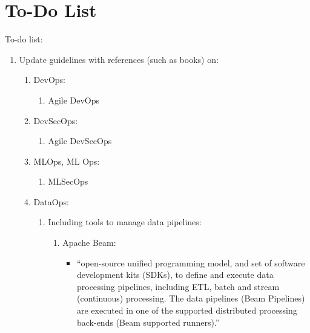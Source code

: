 \documentclass[letter,12pt]{article}
\begin{document}
\section*{To-Do List}
\label{sec:ToDoList}


To-do list: \vspace{-0.3cm}
\begin{enumerate} \itemsep -4pt
\item Update guidelines with references (such as books) on: \vspace{-0.3cm}
	\begin{enumerate} \itemsep -2pt
	\item DevOps: \vspace{-0.2cm}
		\begin{enumerate} \itemsep -2pt
		\item Agile DevOps
		\end{enumerate}
	\item DevSecOps: \vspace{-0.2cm}
		\begin{enumerate} \itemsep -2pt
		\item Agile DevSecOps
		\end{enumerate}
	\item MLOps, ML Ops: \vspace{-0.2cm}
		\begin{enumerate} \itemsep -2pt
		\item MLSecOps
		\end{enumerate}
	\item DataOps: \vspace{-0.2cm}
		\begin{enumerate} \itemsep -2pt
		\item Including tools to manage data pipelines: \vspace{-0.1cm}
			\begin{enumerate} \itemsep -1pt
			\item Apache Beam: \vspace{-0.1cm}
				\begin{itemize} \itemsep -1pt
				\item ``open-source unified programming model, and set of software development kits (SDKs), to define and execute data processing pipelines, including ETL, batch and stream (continuous) processing. The data pipelines (Beam Pipelines) are executed in one of the supported distributed processing back-ends (Beam supported runners).''
				\end{itemize}

\end{enumerate}
\end{enumerate}
\end{enumerate}
\end{enumerate}
\end{document}
